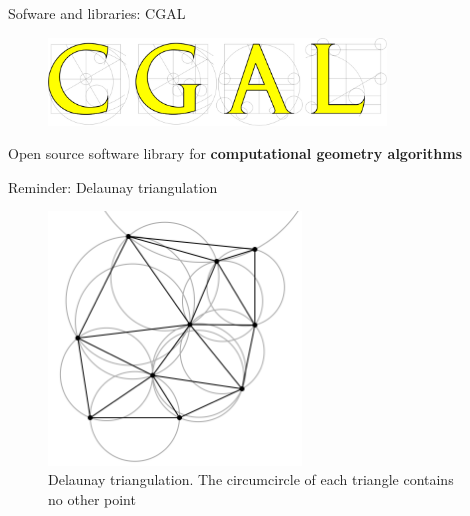 \documentclass[10pt]{beamer}
\begin{document}
\begin{frame}{Sofware and libraries: CGAL}
  \Large
  \begin{figure}[H]
      \centering
      \includegraphics[width=0.8\textwidth]{images/cgal_logo.png}
  \end{figure}
  \begin{center}
    \Large Open source software library for \textbf{computational geometry algorithms}
  \end{center}
\end{frame}

\begin{frame}{Reminder: Delaunay triangulation}
  \Large
  \begin{figure}[H]
    \centering
    \includegraphics[width=0.6\textwidth]{images/Delaunay_circumcircles_vectorial.svg.png}
    \caption{Delaunay triangulation.
    The circumcircle of each triangle contains no other point\cite{delaunay-wiki}}
\end{figure}
\end{frame}
\end{document}
